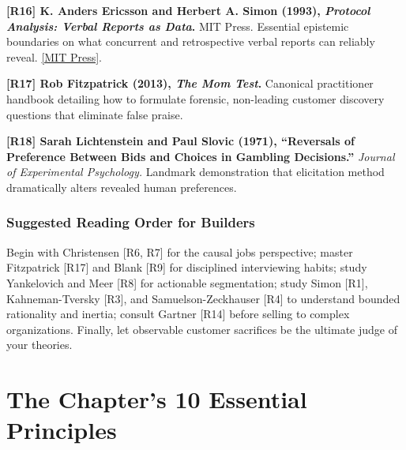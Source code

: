 \noindent\textbf{[R16] K. Anders Ericsson and Herbert A. Simon (1993), \textit{Protocol Analysis: Verbal Reports as Data}.} MIT Press. Essential epistemic boundaries on what concurrent and retrospective verbal reports can reliably reveal. \href{https://doi.org/10.7551/mitpress/5657.001.0001}{[MIT Press]}.

\noindent\textbf{[R17] Rob Fitzpatrick (2013), \textit{The Mom Test}.} Canonical practitioner handbook detailing how to formulate forensic, non-leading customer discovery questions that eliminate false praise.

\noindent\textbf{[R18] Sarah Lichtenstein and Paul Slovic (1971), ``Reversals of Preference Between Bids and Choices in Gambling Decisions.''} \textit{Journal of Experimental Psychology.} Landmark demonstration that elicitation method dramatically alters revealed human preferences.

\subsubsection*{Suggested Reading Order for Builders}
Begin with Christensen [R6, R7] for the causal jobs perspective; master Fitzpatrick [R17] and Blank [R9] for disciplined interviewing habits; study Yankelovich and Meer [R8] for actionable segmentation; study Simon [R1], Kahneman-Tversky [R3], and Samuelson-Zeckhauser [R4] to understand bounded rationality and inertia; consult Gartner [R14] before selling to complex organizations. Finally, let observable customer sacrifices be the ultimate judge of your theories.

\section*{The Chapter's 10 Essential Principles}

